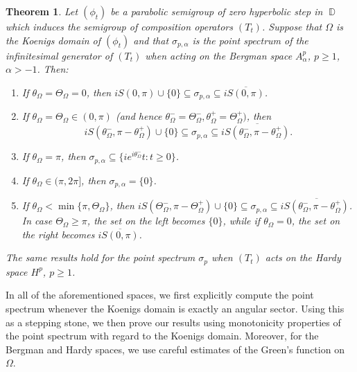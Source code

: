 \documentclass[11pt]{amsart}
\numberwithin{equation}{section}
\newtheorem{theorem}{Theorem}[section]
\theoremstyle{definition}
\DeclareMathOperator{\D}{\mathbb{D}}
\begin{document}
	\begin{theorem}\label{thm:intro bergman 0hs}
		Let $(\phi_t)$ be a parabolic semigroup of zero hyperbolic step in $\D$ which induces the semigroup of composition operators $(T_t)$. Suppose that $\Omega$ is the Koenigs domain of $(\phi_t)$ and that $\sigma_{p,\alpha}$ is the point spectrum of the infinitesimal generator of $(T_t)$ when acting on the Bergman space $A_\alpha^p$, $p\ge1$, $\alpha>-1$. Then:
		\begin{enumerate}
			\item[\textup{(a)}] If $\theta_\Omega=\Theta_\Omega=0$, then $iS(0,\pi)\cup\{0\}\subseteq\sigma_{p,\alpha}\subseteq i\overline{S(0,\pi)}$.
			\item[\textup{(b)}] If $\theta_\Omega=\Theta_\Omega\in(0,\pi)$ (and hence $\theta_\Omega^-=\Theta_\Omega^-, \theta_\Omega^+=\Theta_\Omega^+)$, then
			$$iS(\theta_\Omega^-,\pi-\theta_\Omega^+)\cup\{0\}\subseteq \sigma_{p,\alpha} \subseteq i\overline{S(\theta_\Omega^-,\pi-\theta_\Omega^+)}.$$
			\item[\textup{(c)}] If $\theta_\Omega=\pi$, then $\sigma_{p,\alpha}\subseteq \{ie^{i\theta_\Omega^-}t:t\ge0\}$.
			\item[\textup{(d)}] If $\theta_\Omega\in(\pi,2\pi]$, then $\sigma_{p,\alpha}=\{0\}$.
			\item[\textup{(e)}] If $\theta_\Omega<\min\{\pi,\Theta_\Omega\}$, then $iS(\Theta_\Omega^-,\pi-\Theta_\Omega^+)\cup\{0\}\subseteq\sigma_{p,\alpha}\subseteq i\overline{S(\theta_\Omega^-,\pi-\theta_\Omega^+)}$. In case $\Theta_\Omega\ge\pi$, the set on the left becomes $\{0\}$, while if $\theta_\Omega=0$, the set on the right becomes $i\overline{S(0,\pi)}$.
		\end{enumerate} 
		The same results hold for the point spectrum $\sigma_p$ when $(T_t)$ acts on the Hardy space $H^p$, $p\ge1$.
	\end{theorem}
	
	In all of the aforementioned spaces, we first explicitly compute the point spectrum whenever the Koenigs domain is exactly an angular sector. Using this as a stepping stone, we then prove our results using monotonicity properties of the point spectrum with regard to the Koenigs domain. Moreover, for the Bergman and Hardy spaces, we use careful estimates of the Green's function on $\Omega$.
	
\end{document}
